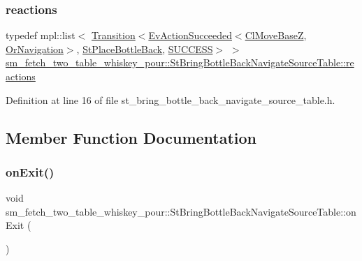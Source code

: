 \subsubsection{\texorpdfstring{reactions}{reactions}}
{\footnotesize\ttfamily typedef mpl\+::list$<$ \hyperlink{classsmacc_1_1Transition}{Transition}$<$\hyperlink{structsmacc_1_1default__events_1_1EvActionSucceeded}{Ev\+Action\+Succeeded}$<$\hyperlink{classcl__move__base__z_1_1ClMoveBaseZ}{Cl\+Move\+BaseZ}, \hyperlink{classsm__fetch__two__table__whiskey__pour_1_1OrNavigation}{Or\+Navigation}$>$, \hyperlink{structsm__fetch__two__table__whiskey__pour_1_1StPlaceBottleBack}{St\+Place\+Bottle\+Back}, \hyperlink{structsmacc_1_1default__transition__tags_1_1SUCCESS}{S\+U\+C\+C\+E\+SS}$>$ $>$ \hyperlink{structsm__fetch__two__table__whiskey__pour_1_1StBringBottleBackNavigateSourceTable_a56c7604d1b51ccec20e24b34bb92e4be}{sm\+\_\+fetch\+\_\+two\+\_\+table\+\_\+whiskey\+\_\+pour\+::\+St\+Bring\+Bottle\+Back\+Navigate\+Source\+Table\+::reactions}}



Definition at line 16 of file st\+\_\+bring\+\_\+bottle\+\_\+back\+\_\+navigate\+\_\+source\+\_\+table.\+h.



\subsection{Member Function Documentation}
\mbox{\label{structsm__fetch__two__table__whiskey__pour_1_1StBringBottleBackNavigateSourceTable_a03a3560f9e509cba3c4c6ae40be45d2a}} 
\subsubsection{\texorpdfstring{on\+Exit()}{onExit()}}
{\footnotesize\ttfamily void sm\+\_\+fetch\+\_\+two\+\_\+table\+\_\+whiskey\+\_\+pour\+::\+St\+Bring\+Bottle\+Back\+Navigate\+Source\+Table\+::on\+Exit (\begin{DoxyParamCaption}{ }\end{DoxyParamCaption})\hspace{0.3cm}{\ttfamily [inline]}}



